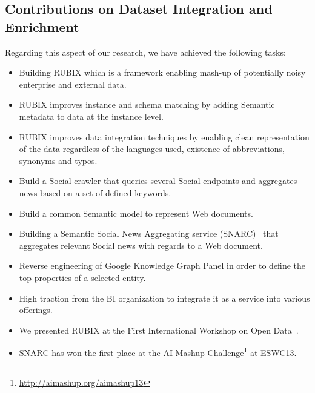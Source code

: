 \documentclass[onecolumn, crcready]{../../Util/LaTEX/iosart2c}
\begin{document}
\subsection{Contributions on Dataset Integration and Enrichment}
Regarding this aspect of our research, we have achieved the following tasks:
 \begin{itemize}
 \item Building RUBIX which is a framework enabling mash-up of potentially noisy enterprise and external data.
 \item RUBIX improves instance and schema matching by adding Semantic metadata to data at the instance level.
 \item RUBIX improves data integration techniques by enabling clean representation of the data regardless of the languages used, existence of abbreviations, synonyms and typos.
 \item Build a Social crawler that queries several Social endpoints and aggregates news based on a set of defined keywords.
 \item Build a common Semantic model to represent Web documents.
 \item Building a Semantic Social News Aggregating service (SNARC)~\cite{Assaf:ESWC:13} that aggregates relevant Social news with regards to a Web document.
 \item Reverse engineering of Google Knowledge Graph Panel in order to define the top properties of a selected entity.
 \item High traction from the BI organization to integrate it as a service into various offerings.
 \item We presented RUBIX at the First International Workshop on Open Data~\cite{Assaf:WOD:12}.
 \item SNARC has won the first place at the AI Mashup Challenge\footnote{\url{http://aimashup.org/aimashup13}} at ESWC13.
\end{itemize}
\end{document}
